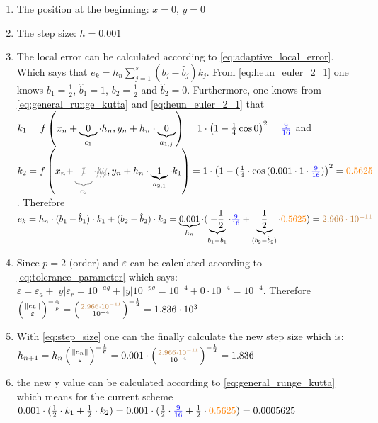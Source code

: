 \begin{enumerate}
    \item The position at the beginning: $x=0$, $y=0$
    \item The step size: $h=0.001$
    \item The local error can be calculated according to \autoref{eq:adaptive_local_error}. Which says that $e_{k}=h_{n} \sum_{j=1}^{s}\left(b_{j}-\hat{b}_{j}\right) k_{j}$. From \autoref{eq:heun_euler_2_1} one knows $b_1=\frac{1}{2}$, $\hat{b}_1=1$, $b_2=\frac{1}{2}$ and $\hat{b}_2=0$. Furthermore, one knows from \autoref{eq:general_runge_kutta} and \autoref{eq:heun_euler_2_1} that $k_1=f\left(x_n+\underbrace{0}_{c_1}\cdot h_n, y_n+h_n\cdot \underbrace{0}_{a_{1,j}} \right)=1\cdot \left(1-\frac{1}{4} \cos{0}\right)^2=\textcolor{blue}{\frac{9}{16}}$ and 
    $k_2=f\left(x_n\textcolor{gray}{+\underbrace{\xout{1}}_{c_2}\cdot \xout{h_n}}, y_n+h_n\cdot \underbrace{1}_{a_{2,1}}\cdot k_1\right)=1 \cdot \left(1-(\frac{1}{4}\cdot \cos{(0.001\cdot 1 \cdot \textcolor{blue}{\frac{9}{16}})}\right)^2=\textcolor{orange}{0.5625}$. Therefore $e_k=h_n\cdot (b_1-\hat{b}_1)\cdot k_1+(b_2-\hat{b}_2)\cdot k_2=\underbrace{0.001}_{h_n}\cdot (\underbrace{-\frac{1}{2}}_{b_1-\hat{b}_1}\cdot\textcolor{blue}{\frac{9}{16}} + \underbrace{\frac{1}{2}}_{(b_2-\hat{b}_2)} \cdot \textcolor{orange}{0.5625} )= \textcolor{brown}{2.966\cdot 10^{-11}}$
    \item Since $p=2$ (order) and $\varepsilon$ can be calculated according to \autoref{eq:tolerance_parameter} which says: $\varepsilon=\varepsilon_{a}+|y| \varepsilon_{r}=10^{-a g}+|y| 10^{-p g} = 10^{-4}+0 \cdot  10^{-4}=10^{-4}$. Therefore $\left(\frac{\left\|e_k\right\|}{\varepsilon}\right)^{-\frac{1}{\widetilde{p}}}=\left(\frac{\textcolor{brown}{2.966\cdot 10^{-11}}}{10^{-4}}\right)^{-\frac{1}{2}}=1.836\cdot 10^3$
    \item With \autoref{eq:step_size} one can the finally calculate the new step size which is: $h_{n+1}=h_{n}\left(\frac{\left\|e_{n}\right\|}{\varepsilon}\right)^{-\frac{1}{\bar{p}}}=0.001\cdot \left(\frac{\textcolor{brown}{2.966\cdot 10^{-11}}}{10^{-4}}\right)^{-\frac{1}{2}}=1.836$
    \item the new y value can be calculated according to \autoref{eq:general_runge_kutta} which means for the current scheme $0.001\cdot (\frac{1}{2}\cdot k_1+\frac{1}{2}\cdot k_2)=0.001\cdot (\frac{1}{2}\cdot \textcolor{blue}{\frac{9}{16}}+\frac{1}{2}\cdot \textcolor{orange}{0.5625})=0.0005625$
\end{enumerate}


